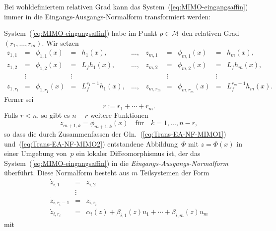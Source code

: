 Bei wohldefiniertem relativen Grad kann das System~(\ref{eq:MIMO-eingangsaffin})
immer in die Eingangs-Ausgangs-Normalform transformiert werden:
\begin{theorem}
\label{thm:EA-NF-MIMO}System~(\ref{eq:MIMO-eingangsaffin}) habe
im Punkt $p\in\mathcal{M}$ den relativen Grad $(r_{1},\ldots,r_{m})$.
Wir setzen
\begin{equation}
\begin{array}{lccclclcccl}
z_{1,1} & = & \phi_{1,1}(x) & = & h_{1}(x), & \ldots, & z_{m,1} & = & \phi_{m,1}(x) & = & h_{m}(x),\\
z_{1,2} & = & \phi_{1,2}(x) & = & L_{f}h_{1}(x), & \ldots, & z_{m,2} & = & \phi_{m,2}(x) & = & L_{f}h_{m}(x),\\
 & \vdots &  & \vdots &  &  &  & \vdots &  & \vdots\\
z_{1,r_{1}} & = & \phi_{1,r_{1}}(x) & = & L_{f}^{r_{1}-1}h_{1}(x), & \ldots, & z_{m,r_{m}} & = & \phi_{m,r_{m}}(x) & = & L_{f}^{r_{m}-1}h_{m}(x).
\end{array}\label{eq:Trans-EA-NF-MIMO1}
\end{equation}
Ferner sei 
\begin{equation}
r:=r_{1}+\cdots+r_{m}.\label{eq:vektor-relativer-grad-summarisch}
\end{equation}
Falls $r<n$, so gibt es $n-r$ weitere Funktionen 
\begin{equation}
z_{m+1,k}=\phi_{m+1,k}(x)\quad\text{für}\quad k=1,\ldots,n-r,\label{eq:Trans-EA-NF-MIMO2}
\end{equation}
so dass die durch Zusammenfassen der Gln.~(\ref{eq:Trans-EA-NF-MIMO1})
und~(\ref{eq:Trans-EA-NF-MIMO2}) entstandene Abbildung~$\Phi$
mit $z=\Phi(x)$ in einer Umgebung von~$p$ ein lokaler Diffeomorphismus
ist, der das System~(\ref{eq:MIMO-eingangsaffin}) in die \emph{Eingangs-Ausgangs-Normalform}
überführt. Diese Normalform besteht aus $m$ Teilsystemen der Form
\begin{equation}
\begin{array}{lcl}
\dot{z}_{i,1} & = & z_{i,2}\\
 & \vdots\\
\dot{z}_{i,r_{i}-1} & = & z_{i,r_{i}}\\
\dot{z}_{i,r_{i}} & = & \alpha_{i}(z)+\beta_{i,1}(z)u_{1}+\cdots+\beta_{i,m}(z)u_{m}
\end{array}\label{eq:EA-NF-MIMO1}
\end{equation}
mit 
\[
\begin{array}{lcl}

\end{array}\]
\end{theorem}
